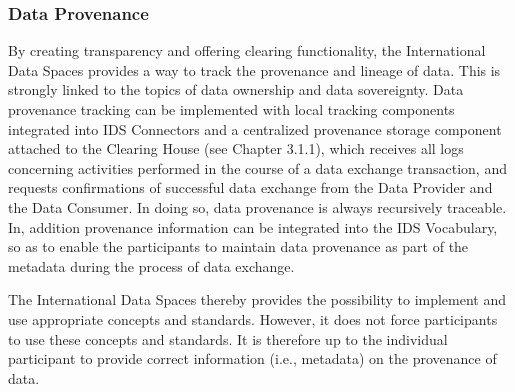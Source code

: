\subsubsection{Data Provenance}
By creating transparency and offering clearing functionality, the International Data Spaces provides a way to track the provenance and lineage of data. This is strongly linked to the topics of data ownership and data sovereignty.  Data provenance tracking can be implemented with local tracking components integrated into IDS Connectors and a centralized provenance storage component attached to the Clearing House (see Chapter 3.1.1), which receives all logs concerning activities performed in the course of a data exchange transaction, and requests confirmations of successful data exchange from the Data Provider and the Data Consumer. In doing so, data provenance is always recursively traceable. In, addition provenance information can be integrated into the IDS Vocabulary, so as to enable the participants to maintain data provenance as part of the metadata during the process of data exchange.

The International Data Spaces thereby provides the possibility to implement and use appropriate concepts and standards. However, it does not force participants to use these concepts and standards. It is therefore up to the individual participant to provide correct information (i.e., metadata) on the provenance of data.

